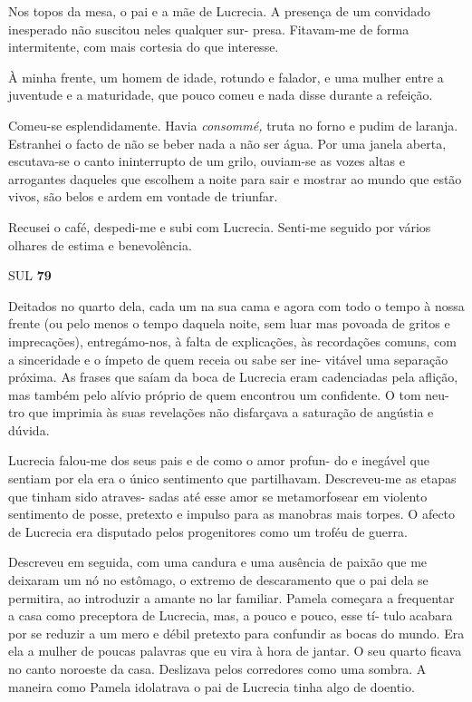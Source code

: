 Nos topos da mesa, o pai e a mãe de Lucrecia. A presença de um convidado
inesperado não suscitou neles qualquer sur- presa. Fitavam-me de forma
intermitente, com mais cortesia do que interesse.

À minha frente, um homem de idade, rotundo e falador, e uma mulher entre
a juventude e a maturidade, que pouco comeu e nada disse durante a
refeição.

Comeu-se esplendidamente. Havia \emph{consommé, }truta no forno e pudim
de laranja. Estranhei o facto de não se beber nada a não ser água. Por
uma janela aberta, escutava-se o canto ininterrupto de um grilo,
ouviam-se as vozes altas e arrogantes daqueles que escolhem a noite para
sair e mostrar ao mundo que estão vivos, são belos e ardem em vontade de
triunfar.

Recusei o café, despedi-me e subi com Lucrecia. Senti-me seguido por
vários olhares de estima e benevolência.

SUL \textbf{79}

Deitados no quarto dela, cada um na sua cama e agora com todo o tempo à
nossa frente (ou pelo menos o tempo daquela noite, sem luar mas povoada
de gritos e imprecações), entregámo-nos, à falta de explicações, às
recordações comuns, com a sinceridade e o ímpeto de quem receia ou sabe
ser ine- vitável uma separação próxima. As frases que saíam da boca de
Lucrecia eram cadenciadas pela aflição, mas também pelo alívio próprio
de quem encontrou um confidente. O tom neu- tro que imprimia às suas
revelações não disfarçava a saturação de angústia e dúvida.

Lucrecia falou-me dos seus pais e de como o amor profun- do e inegável
que sentiam por ela era o único sentimento que partilhavam. Descreveu-me
as etapas que tinham sido atraves- sadas até esse amor se metamorfosear
em violento sentimento de posse, pretexto e impulso para as manobras
mais torpes. O afecto de Lucrecia era disputado pelos progenitores como
um troféu de guerra.

Descreveu em seguida, com uma candura e uma ausência de paixão que me
deixaram um nó no estômago, o extremo de descaramento que o pai dela se
permitira, ao introduzir a amante no lar familiar. Pamela começara a
frequentar a casa como preceptora de Lucrecia, mas, a pouco e pouco,
esse tí- tulo acabara por se reduzir a um mero e débil pretexto para
confundir as bocas do mundo. Era ela a mulher de poucas palavras que eu
vira à hora de jantar. O seu quarto ficava no canto noroeste da casa.
Deslizava pelos corredores como uma sombra. A maneira como Pamela
idolatrava o pai de Lucrecia tinha algo de doentio.

